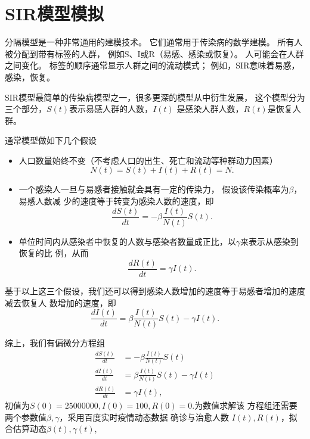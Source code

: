 \documentclass[a4paper]{book}
\numberwithin{equation}{chapter}
\theoremstyle{definition}
\begin{document}
  \section{SIR模型模拟}
  分隔模型是一种非常通用的建模技术。
  它们通常用于传染病的数学建模。
  所有人被分配到带有标签的人群，
  例如S、I或R（易感、感染或恢复）。
  人可能会在人群之间变化。
  标签的顺序通常显示人群之间的流动模式；
  例如，SIR意味着易感，感染，恢复。

  SIR模型最简单的传染病模型之一，很多更深的模型从中衍生发展，
  这个模型分为三个部分，$S(t)$表示易感人群的人数，$I(t)$
  是感染人群人数，$R(t)$是恢复人群。

  通常模型做如下几个假设
  \begin{itemize}
    \item 人口数量始终不变（不考虑人口的出生、死亡和流动等种群动力因素） 
    \[N(t) = S(t) + I(t) + R(t) = N.\]

    \item 一个感染人一旦与易感者接触就会具有一定的传染力，
    假设该传染概率为$\beta$，易感人数减
    少的速度等于转变为感染人数的速度，即
    \[\frac{d S(t)}{dt} = -\beta \frac{I(t)}{N(t)} S(t).\]

    \item 单位时间内从感染者中恢复的人数与感染者数量成正比，以$\gamma$来表示从感染到恢复的比
    例，从而
    \[\frac{d R(t)}{dt} = \gamma I(t).\]
  \end{itemize}
  基于以上这三个假设，我们还可以得到感染人数增加的速度等于易感者增加的速度减去恢复人
数增加的速度，即
 \[\frac{d I(t)}{dt } = \beta \frac{I(t)}{N(t)} S(t) - \gamma I(t).\]

 综上，我们有偏微分方程组 
 \begin{align*}
  \frac{d S(t)}{d t} &= -\beta\frac{I(t)}{N(t)} S(t) \\
  \frac{d I(t)}{d t} &= \beta \frac{I(t)}{N(t)} S(t)-\gamma I(t) \\
  \frac{d R(t)}{d t} &= \gamma I(t),
\end{align*}
初值为$S(0) = 25000000, I(0) = 100, R(0) = 0$.为数值求解该
方程组还需要两个参数值$\beta, \gamma$，采用百度实时疫情动态数据
确诊与治愈人数
$I(t), R(t)$，拟合估算动态$\beta(t), \gamma(t)$,
\end{document}
